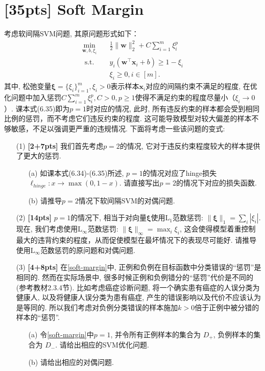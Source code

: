 \documentclass[a4paper,UTF8]{article}
\numberwithin{equation}{section}
\theoremstyle{definition}
\newcommand{\vct}[1]{\boldsymbol{#1}} %
\newcommand{\vw}{\vct{w}}
\newcommand{\vx}{\vct{x}}
\begin{document}
\section{[35pts] Soft Margin}
考虑软间隔SVM问题, 其原问题形式如下：
\begin{equation}
    \begin{aligned}
        \min _{\vw, b, \xi_{i}} \quad & \frac{1}{2}\|\vw\|_{2}^{2}+C \sum_{i=1}^{m} \xi^p_{i} \\
        \text { s.t. } \quad & y_{i}\left(\vw^{\top} \vx_{i}+b\right) \geq 1- \xi_{i} \\
        & \xi_{i} \geq 0, i \in [m] .
    \end{aligned}
    \label{soft-margin}
\end{equation}
其中, 松弛变量$\bm{\xi} = \{\xi_i\}_{i=1}^m, \xi_i > 0$表示样本$\vx_i$对应的间隔约束不满足的程度, 在优化问题中加入惩罚$C\sum_{i=1}^m \xi^p_i, C>0, p\ge 1$使得不满足约束的程度尽量小（$\xi_i\rightarrow 0$）. 课本式(6.35)即为$p=1$时对应的情况, 此时, 所有违反约束的样本都会受到相同比例的惩罚，而不考虑它们违反约束的程度. 这可能导致模型对较大偏差的样本不够敏感，不足以强调更严重的违规情况. 下面将考虑一些该问题的变式:
\begin{enumerate}
    \item[(1)] \textbf{[2+7pts]} 我们首先考虑$p=2$的情况, 它对于违反约束程度较大的样本提供了更大的惩罚. 
    \begin{enumerate}
        \item[(a)] 如课本式(6.34)-(6.35)所述, $p=1$的情况对应了hinge损失$\ell_{hinge} :x \to \max(0, 1-x)$. 请直接写出$p=2$的情况下对应的损失函数. 
        \item[(b)] 请推导$p=2$情况下软间隔SVM的对偶问题. 
    \end{enumerate}
    \item[(2)] \textbf{[14pts]} $p=1$的情况下, 相当于对向量$\bm{\xi}$使用$\mathrm{L}_1$范数惩罚: $\lVert \bm{\xi} \rVert_1 = \sum_{i}  |\xi_i|$. 现在, 我们考虑使用$\mathrm{L}_\infty$范数惩罚: $\lVert \bm{\xi} \rVert_\infty = \max_i  \xi_i $, 这会使得模型着重控制最大的违背约束的程度，从而促使模型在最坏情况下的表现尽可能好. 请推导使用$\mathrm{L}_\infty$范数惩罚的原问题和对偶问题.
    \item[(3)] \textbf{[4+8pts]} 在\eqref{soft-margin}中, 正例和负例在目标函数中分类错误的“惩罚”是相同的. 然而在实际场景中, 很多时候正例和负例错分的“惩罚”代价是不同的 (参考教材2.3.4节). 比如考虑癌症诊断问题, 将一个确实患有癌症的人误分类为健康人, 以及将健康人误分类为患有癌症, 产生的错误影响以及代价不应该认为是等同的. 所以我们考虑对负例分类错误的样本施加$k>0$倍于正例中被分错的样本的“惩罚”. 
    \begin{enumerate}
        \item[(a)] 令\eqref{soft-margin}中$p=1$, 并令所有正例样本的集合为 $D_{+}$, 负例样本的集合为 $D_{-}$. 请给出相应的SVM优化问题.
        \item[(b)] 请给出相应的对偶问题.
    \end{enumerate}
\end{enumerate}
\end{document}
